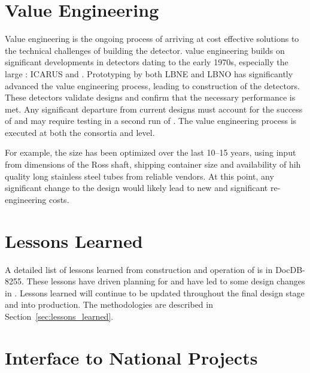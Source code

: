 \section{Value Engineering}
\label{sec:fdsp-coord-ve}

Value engineering is the ongoing process of arriving at cost effective
solutions to the technical challenges of building the 
detector.  value engineering builds on significant
developments in  detectors dating to the early 1970s,
especially the large : ICARUS and
. Prototyping by both LBNE and LBNO has
significantly advanced the value engineering process, leading to
construction of the  detectors. These detectors validate
 designs and confirm that the necessary performance is
met. Any significant departure from current designs must account for
the success of  and may require testing in a second
run of . The value engineering process is executed at
both the consortia and  level.

For example, the  size has been optimized over the last 10--15 years,
using input from dimensions of the Ross shaft, shipping container size
and availability of hih quality long stainless steel tubes from reliable vendors.
At this point, any significant change to the  design would likely
lead to new and significant re-engineering costs.


\section{Lessons Learned}
\label{sec:fdsp-coord-lessons}

A detailed list of lessons learned from construction and operation of
 is in DocDB-8255. These lessons have driven planning for
 and have led to some design changes in
. Lessons learned will continue to be updated throughout
the final design stage and into production. The methodologies are
described in Section~\ref{sec:lessons_learned}.

\section{Interface to National Projects}
\label{sec:fdsp-coord-national}


